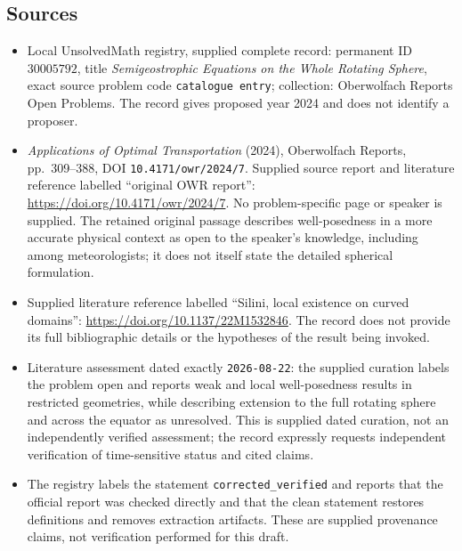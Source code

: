 \documentclass[11pt]{article}
\begin{document}
\subsection{Sources}
\begin{itemize}
\item Local UnsolvedMath registry, supplied complete record: permanent ID \(30005792\), title \emph{Semigeostrophic Equations on the Whole Rotating Sphere}, exact source problem code \texttt{catalogue entry}; collection: Oberwolfach Reports Open Problems. The record gives proposed year 2024 and does not identify a proposer.
\item \emph{Applications of Optimal Transportation} (2024), Oberwolfach Reports, pp.~309--388, DOI \texttt{10.4171/owr/2024/7}. Supplied source report and literature reference labelled ``original OWR report'': \url{https://doi.org/10.4171/owr/2024/7}. No problem-specific page or speaker is supplied. The retained original passage describes well-posedness in a more accurate physical context as open to the speaker's knowledge, including among meteorologists; it does not itself state the detailed spherical formulation.
\item Supplied literature reference labelled ``Silini, local existence on curved domains'': \url{https://doi.org/10.1137/22M1532846}. The record does not provide its full bibliographic details or the hypotheses of the result being invoked.
\item Literature assessment dated exactly \texttt{2026-08-22}: the supplied curation labels the problem open and reports weak and local well-posedness results in restricted geometries, while describing extension to the full rotating sphere and across the equator as unresolved. This is supplied dated curation, not an independently verified assessment; the record expressly requests independent verification of time-sensitive status and cited claims.
\item The registry labels the statement \texttt{corrected\_verified} and reports that the official report was checked directly and that the clean statement restores definitions and removes extraction artifacts. These are supplied provenance claims, not verification performed for this draft.
\end{itemize}
\end{document}
